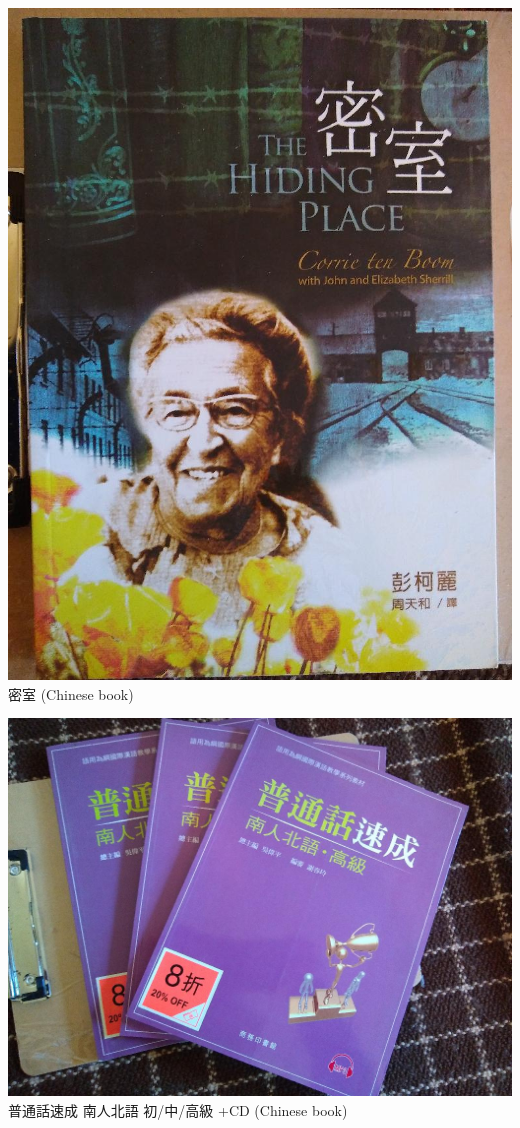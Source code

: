 \documentclass[t]{beamer}
\newcommand{\htarget}[2]{\hypertarget{#1}{#2}}
\begin{document}
\begin{frame}\htarget{hide}{} \begin{center}
\includegraphics[height=0.8\textheight]{book07_mini.jpg} \\
密室 (Chinese book)
\end{center} \end{frame}
\begin{frame}\htarget{putonghua}{} \begin{center}
\includegraphics[height=0.8\textheight]{book08_mini.jpg} \\
普通話速成 南人北語 初/中/高級 +CD (Chinese book)
\end{center} \end{frame}
\end{document}
